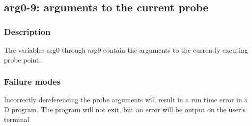 \clearpage
{}
{}
\label{vars:arg09}
\subsection*{arg0-9: arguments to the current probe}

\subsubsection*{Description}

The variables arg0 through arg9 contain the arguments to the currently
excuting probe point.

\subsubsection*{Failure modes}

Incorrectly dereferencing the probe arguments will result in a run
time error in a D program.  The program will not exit, but an error
will be output on the user's terminal
